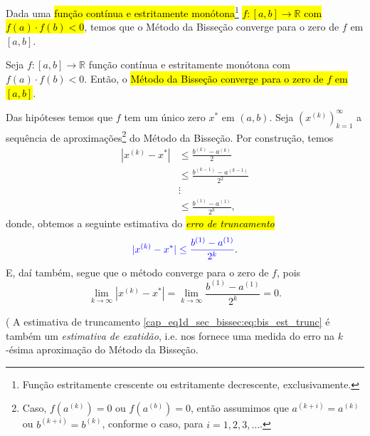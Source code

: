 Dada uma \hl{função contínua e estritamente monótona}\footnote{Função estritamente crescente ou estritamente decrescente, exclusivamente.} \hl{$f:[a, b]\to\mathbb{R}$ com $f(a)\cdot f(b) < 0$}, temos que o Método da Bisseção converge para o zero de $f$ em $[a, b]$.

\begin{teo}\label{cap_eq1d_sec_bissec:teo:bissece}
  Seja $f:[a, b]\to\mathbb{R}$ função contínua e estritamente monótona com $f(a)\cdot f(b) < 0$. Então, o \hl{Método da Bisseção converge para o zero de $f$ em $[a, b]$}.
\end{teo}
\begin{dem}
  Das hipóteses temos que $f$ tem um único zero $x^*$ em $(a, b)$. Seja $(x^{(k)})_{k=1}^\infty$ a sequência de aproximações\footnote{Caso, $f\left(a^{(k)}\right)=0$ ou $f\left(a^{(b)}\right)=0$, então assumimos que $a^{(k+i)} = a^{(k)}$ ou $b^{(k+i)} = b^{(k)}$, conforme o caso, para $i=1,2,3,\ldots$.} do Método da Bisseção. Por construção, temos
  \begin{align}
    |x^{(k)} - x^{*}| &\leq \frac{b^{(k)}-a^{(k)}}{2}\\
                      &\leq \frac{b^{(k-1)}-a^{(k-1)}}{2^2}\\
                      &\vdots \\
                      &\leq \frac{b^{(1)}-a^{(1)}}{2^k},
  \end{align}
  donde, obtemos a seguinte estimativa do \hl{\emph{erro de truncamento}}
  \begin{equation}\label{cap_eq1d_sec_bissec:eq:bis_est_trunc}
    {\color{blue}|x^{(k)} - x^{*}| \leq \frac{b^{(1)}-a^{(1)}}{2^k}}.
  \end{equation}
  E, daí também, segue que o método converge para o zero de $f$, pois
  \begin{equation}
    \lim_{k\to\infty} |x^{(k)}-x^{*}| = \lim_{k\to\infty} \frac{b^{(1)}-a^{(1)}}{2^k} = 0.
  \end{equation}
\end{dem}

\begin{obs}(
  A estimativa de truncamento \ref{cap_eq1d_sec_bissec:eq:bis_est_trunc} é também um \emph{estimativa de exatidão}, i.e. nos fornece uma medida do erro na $k$-ésima aproximação do Método da Bisseção.
\end{obs}

